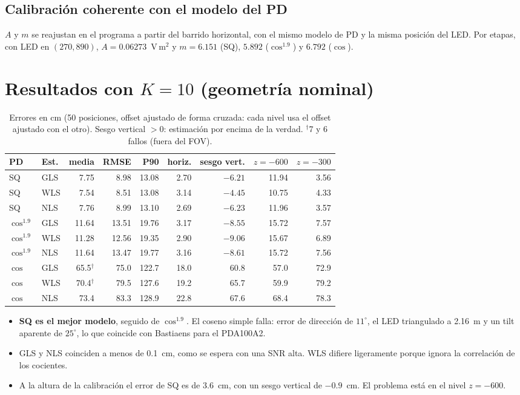 \documentclass[11pt,a4paper]{article}
\begin{document}
\subsection{Calibración coherente con el modelo del PD}
$A$ y $m$ se reajustan en el programa a partir del barrido horizontal, con el mismo modelo de PD y la misma posición del LED. Por etapas, con LED en $(270,890)$, $A=0.06273$~V\,m$^2$ y $m=6.151$ (SQ), $5.892$ ($\cos^{1.9}$) y $6.792$ ($\cos$).

\section{Resultados con $K=10$ (geometría nominal)}
\begin{table}[H]\centering\small
\begin{tabular}{llrrrrrrr}\toprule
PD & Est. & media & RMSE & P90 & horiz. & sesgo vert. & $z=-600$ & $z=-300$\\\midrule
SQ & GLS & 7.75 & 8.98 & 13.08 & 2.70 & $-6.21$ & 11.94 & 3.56\\
SQ & WLS & 7.54 & 8.51 & 13.08 & 3.14 & $-4.45$ & 10.75 & 4.33\\
SQ & NLS & 7.76 & 8.99 & 13.10 & 2.69 & $-6.23$ & 11.96 & 3.57\\
$\cos^{1.9}$ & GLS & 11.64 & 13.51 & 19.76 & 3.17 & $-8.55$ & 15.72 & 7.57\\
$\cos^{1.9}$ & WLS & 11.28 & 12.56 & 19.35 & 2.90 & $-9.06$ & 15.67 & 6.89\\
$\cos^{1.9}$ & NLS & 11.64 & 13.47 & 19.77 & 3.16 & $-8.61$ & 15.72 & 7.56\\
$\cos$ & GLS & 65.5$^\dagger$ & 75.0 & 122.7 & 18.0 & 60.8 & 57.0 & 72.9\\
$\cos$ & WLS & 70.4$^\dagger$ & 79.5 & 127.6 & 19.2 & 65.7 & 59.9 & 79.2\\
$\cos$ & NLS & 73.4 & 83.3 & 128.9 & 22.8 & 67.6 & 68.4 & 78.3\\\bottomrule
\end{tabular}
\caption{Errores en cm (50 posiciones, offset ajustado de forma cruzada: cada nivel usa el offset ajustado con el otro). Sesgo vertical $>0$: estimación por encima de la verdad. $^\dagger$7 y 6 fallos (fuera del FOV).}
\end{table}
\begin{itemize}
\item \textbf{SQ es el mejor modelo}, seguido de $\cos^{1.9}$. El coseno simple falla: error de dirección de $11^\circ$, el LED triangulado a 2.16~m y un tilt aparente de $25^\circ$, lo que coincide con Bastiaens para el PDA100A2.
\item GLS y NLS coinciden a menos de 0.1~cm, como se espera con una SNR alta. WLS difiere ligeramente porque ignora la correlación de los cocientes.
\item A la altura de la calibración el error de SQ es de 3.6~cm, con un sesgo vertical de $-0.9$~cm. El problema está en el nivel $z=-600$.
\end{itemize}
\end{document}
